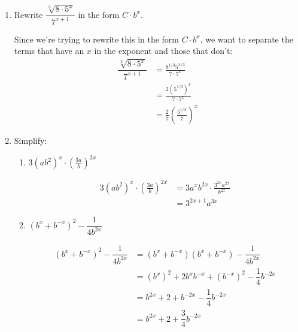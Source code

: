 \documentclass{article}
\theoremstyle{theorem}
\begin{document}
\begin{enumerate}[resume]
\item 
  \begin{problem}[\vfill]
    Rewrite $\dfrac{\sqrt[3]{8 \cdot 5^x}}{7^{x + 1}}$ in the form $C \cdot b^x$.
  \end{problem}

  \begin{solution}
    Since we're trying to rewrite this in the form $C \cdot b^x$, we want to separate the terms that have an $x$ in the exponent and those that don't:
    \begin{align*}
      \dfrac{\sqrt[3]{8 \cdot 5^x}}{7^{x + 1}} &= \frac{8^{1/3} 5^{x/3}}{7 \cdot 7^x} \\
      &= \frac{2 \left( 5^{1/3} \right)^x}{7 \cdot 7^x} \\
      &= \boxed{\frac{2}{7} \left( \frac{5^{1/3}}{7} \right)^x}
    \end{align*}
  \end{solution}  

\item 

  Simplify:
  \begin{enumerate}

  \item
    \begin{problem}
      $\displaystyle 3(ab^2)^{x} \cdot \left(\frac{3a}{b} \right)^{2x}$
    \end{problem}

    \begin{solution}
      \begin{align*}
        3(ab^2)^{x} \cdot \left(\frac{3a}{b} \right)^{2x} &= 3 a^x b^{2x} \cdot \frac{3^{2x} a^{2x}}{b^{2x}} \\
        &= \boxed{3^{2x + 1} a^{3x}}
      \end{align*}
    \end{solution}

  \item
    \begin{problem}
      $\left( b^{x} + b^{-x} \right)^2 - \dfrac{1}{4 b^{2x}}$
    \end{problem}

    \begin{solution}
      \begin{align*}
        \left( b^{x} + b^{-x} \right)^2 - \dfrac{1}{4 b^{2x}} &= \left( b^{x} + b^{-x} \right)\left( b^{x} + b^{-x} \right) - \dfrac{1}{4 b^{2x}} \\
        &= \left( b^{x} \right)^2 + 2 b^{x} b^{-x} + \left( b^{-x} \right)^2 - \dfrac{1}{4} b^{-2x} \\
        &= b^{2x} + 2 + b^{-2x} - \dfrac{1}{4} b^{-2x} \\
        &= \boxed{b^{2x} + 2 + \dfrac{3}{4} b^{-2x}}
      \end{align*}
    \end{solution}
  \end{enumerate}


\end{enumerate}
\end{document}

